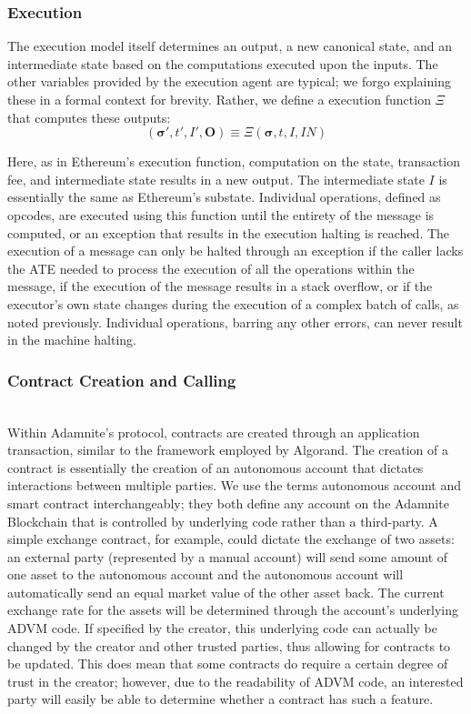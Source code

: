 \documentclass[conference]{IEEEtran}
\begin{document}
\subsubsection{Execution}
The execution model itself determines an output, a new canonical state, and an intermediate state based on the computations executed upon the inputs. The other variables provided by the execution agent are typical; we forgo explaining these in a formal context for brevity. Rather, we define a execution function $\Xi$ that computes these outputs:
\begin{equation}
(\boldsymbol{\sigma}', t', I', \mathbf{O}) \equiv \Xi(\boldsymbol{\sigma}, t, I, IN)
\end{equation}

Here, as in Ethereum's execution function, computation on the state, transaction fee, and intermediate state results in a new output. The intermediate state $I$ is essentially the same as Ethereum's substate. Individual operations, defined as opcodes, are executed using this function until the entirety of the message is computed, or an exception that results in the execution halting is reached. The execution of a message can only be halted through an exception if the caller lacks the ATE needed to process the execution of all the operations within the message, if the execution of the message results in a stack overflow, or if the executor's own state changes during the execution of a complex batch of calls, as noted previously. Individual operations, barring any other errors, can never result in the machine halting.\\

\subsubsection{Contract Creation and Calling}\\
Within Adamnite's protocol, contracts are created through an application transaction, similar to the framework employed by Algorand. The creation of a contract is essentially the creation of an autonomous account that dictates interactions between multiple parties. We use the terms autonomous account and smart contract interchangeably; they both define any account on the Adamnite Blockchain that is controlled by underlying code rather than a third-party. A simple exchange contract, for example, could dictate the exchange of two assets: an external party (represented by a manual account) will send some amount of one asset to the autonomous account and the autonomous account will automatically send an equal market value of the other asset back. The current exchange rate for the assets will be determined through the account's underlying ADVM code. If specified by the creator, this underlying code can actually be changed by the creator and other trusted parties, thus allowing for contracts to be updated. This does mean that some contracts do require a certain degree of trust in the creator; however, due to the readability of ADVM code, an interested party will easily be able to determine whether a contract has such a feature.\\
\end{document}
